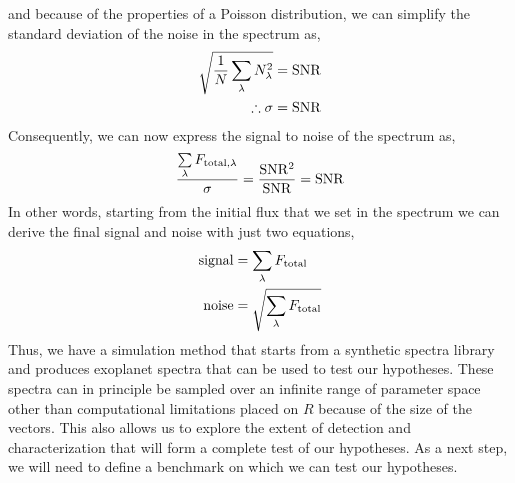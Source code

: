 and because of the properties of a Poisson distribution, we can simplify the standard deviation of the noise in the spectrum as,
\begin{eqnarray}
    \sqrt{\dfrac{1}{N}\sum\limits_\lambda N^2_\lambda}&= \rm{SNR}\\
    \therefore \sigma &= \rm{SNR}
\end{eqnarray}
Consequently, we can now express the signal to noise of the spectrum as,
\begin{equation}
   \dfrac{\sum\limits_{\lambda}F_{\rm{total,\lambda}}}{\sigma}=\rm{\dfrac{SNR^2}{SNR}= SNR }
\end{equation}
In other words, starting from the initial flux that we set in the spectrum we can derive the final signal and noise with just two equations,
\begin{eqnarray}
    \rm{signal} &= \sum\limits_{\lambda}F_{\rm{total}}\\
    \rm{noise} &= \sqrt{\sum\limits_{\lambda}F_{\rm{total}}}\\
\end{eqnarray}
Thus, we have a simulation method that starts from a synthetic spectra library and produces exoplanet spectra that can be used to test our hypotheses.
These spectra can in principle be sampled over an infinite range of parameter space other than computational limitations placed on $R$ because of the size of the vectors.
This also allows us to explore the extent of detection and characterization that will form a complete test of our hypotheses.
As a next step, we will need to define a benchmark on which we can test our hypotheses.


